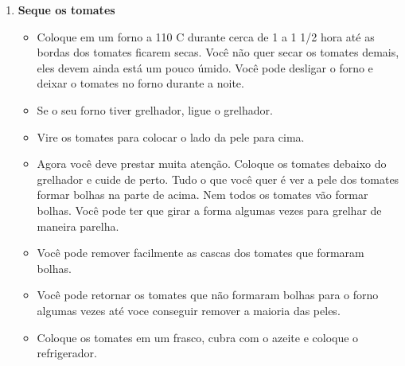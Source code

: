 \documentclass [11pt, letterpaper] {article}
\begin{document}
\begin {description}
\begin {enumerate}
\item {\bf Seque os tomates}
\begin {itemize}
\item Coloque em um forno a 110 C durante cerca de 1 a 1 1/2 hora até as bordas dos tomates ficarem
   secas. Você não quer secar os tomates demais, eles devem
   ainda está um pouco úmido. Você pode desligar o forno e deixar o
   tomates no forno durante a noite.
\item Se o seu forno tiver grelhador, ligue o grelhador.
\item Vire os tomates para colocar o lado da pele para cima.
\item Agora você deve prestar muita atenção. Coloque os tomates debaixo do
    grelhador e cuide de perto. Tudo o que você quer \'e ver a pele dos tomates formar bolhas
    na parte de acima. Nem todos os tomates v\~ao formar bolhas. Você pode ter que girar a forma algumas vezes para grelhar de maneira parelha.
\item Você pode remover facilmente as cascas dos tomates que formaram bolhas.
\item Você pode retornar os tomates que não formaram bolhas para o forno
    algumas vezes at\'e voce conseguir remover a maioria das peles.
    \item Coloque os tomates em um frasco, cubra com o azeite e coloque
    o refrigerador.
\end {itemize}
\end {enumerate}
\end {description}
\end{document}
